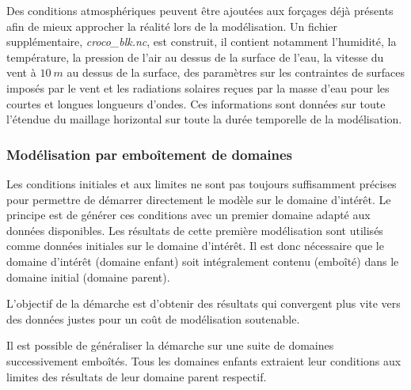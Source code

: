 \documentclass[10pt,a4paper,titlepage]{article}
\begin{document}
Des conditions atmosphériques peuvent être ajoutées aux forçages déjà présents afin de mieux approcher la réalité lors de la modélisation.
Un fichier supplémentaire, \textit{croco\_blk.nc}, est construit, il contient notamment l'humidité, la température, la pression de l'air au dessus de la surface de l'eau, la vitesse du vent à $10~m$ au dessus de la surface, des paramètres sur les contraintes de surfaces imposés par le vent et les radiations solaires reçues par la masse d'eau pour les courtes et longues longueurs d'ondes.
Ces informations sont données sur toute l'étendue du maillage horizontal sur toute la durée temporelle de la modélisation.

\subsubsection{Modélisation par emboîtement de domaines}
\label{subsub:enchainement_modelisations}

Les conditions initiales et aux limites ne sont pas toujours suffisamment précises pour permettre de démarrer directement le modèle sur le domaine d'intérêt.
Le principe est de générer ces conditions avec un premier domaine adapté aux données disponibles.
Les résultats de cette première modélisation sont utilisés comme données initiales sur le domaine d'intérêt.
Il est donc nécessaire que le domaine d'intérêt (domaine enfant) soit intégralement contenu (emboîté) dans le domaine initial (domaine parent).

L'objectif de la démarche est d'obtenir des résultats qui convergent plus vite vers des données justes pour un coût de modélisation soutenable.

Il est possible de généraliser la démarche sur une suite de domaines successivement emboîtés.
Tous les domaines enfants extraient leur conditions aux limites des résultats de leur domaine parent respectif.
\end{document}
